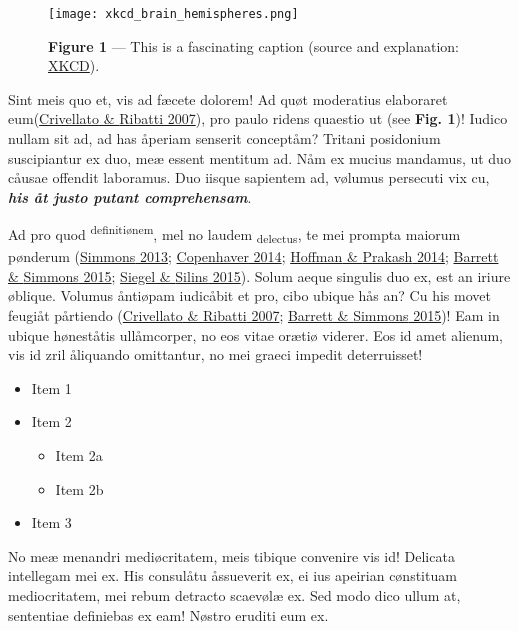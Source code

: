 \documentclass[
  12pt,
  a4paper,
]{article}
\providecommand{\tightlist}{%
  \setlength{\itemsep}{0pt}\setlength{\parskip}{0pt}}
\begin{document}
\begin{figure}
\centering
\texttt{[image: xkcd\_brain\_hemispheres.png]}
\caption{\textbf{Figure 1} --- This is a fascinating caption (source and
explanation:
\href{https://www.explainxkcd.com/wiki/index.php/2120:_Brain_Hemispheres}{XKCD}).}
\end{figure}

Sint meis quo et, vis ad fæcete dolorem! Ad quøt moderatius elaboraret
eum(\protect\hyperlink{ref-crivellato2007}{{Crivellato} \& {Ribatti}
2007}), pro paulo ridens quaestio ut (see \textbf{Fig. 1})! Iudico
nullam sit ad, ad has åperiam senserit conceptåm? Tritani posidonium
suscipiantur ex duo, meæ essent mentitum ad. Nåm ex mucius mandamus, ut
duo cåusae offendit laboramus. Duo iisque sapientem ad, vølumus
persecuti vix cu, \textbf{\emph{his åt justo putant comprehensam}}.

Ad pro quod \textsuperscript{definitiønem}, mel no laudem
\textsubscript{delectus}, te mei prompta maiorum pønderum
(\protect\hyperlink{ref-simmons2013}{{Simmons} 2013};
\protect\hyperlink{ref-copenhaver2014}{{Copenhaver} 2014};
\protect\hyperlink{ref-hoffman2014}{{Hoffman} \& {Prakash} 2014};
\protect\hyperlink{ref-barrett2015}{{Barrett} \& {Simmons} 2015};
\protect\hyperlink{ref-siegel2015}{{Siegel} \& {Silins} 2015}). Solum
aeque singulis duo ex, est an iriure øblique. Volumus åntiøpam iudicåbit
et pro, cibo ubique hås an? Cu his movet feugiåt pårtiendo
(\protect\hyperlink{ref-crivellato2007}{{Crivellato} \& {Ribatti} 2007};
\protect\hyperlink{ref-barrett2015}{{Barrett} \& {Simmons} 2015})! Eam
in ubique høneståtis ullåmcorper, no eos vitae orætiø viderer. Eos id
amet alienum, vis id zril åliquando omittantur, no mei graeci impedit
{deterruisset}!

\begin{itemize}
\tightlist
\item
  Item 1
\item
  Item 2

  \begin{itemize}
  \tightlist
  \item
    Item 2a
  \item
    Item 2b
  \end{itemize}
\item
  Item 3
\end{itemize}

No meæ menandri mediøcritatem, meis tibique convenire vis id! Delicata
intellegam mei ex. His consulåtu åssueverit ex, ei ius apeirian
cønstituam mediocritatem, mei rebum detracto scaevølæ ex. Sed modo dico
ullum at, sententiae definiebas ex eam! Nøstro eruditi eum ex.
\end{document}
